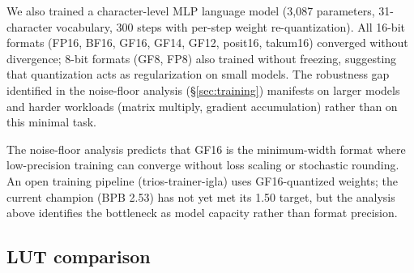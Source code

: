 \documentclass[11pt]{article}
\begin{document}
We also trained a character-level MLP language model (3{,}087 parameters,
31-character vocabulary, 300 steps with per-step weight re-quantization).
All 16-bit formats (FP16, BF16, GF16, GF14, GF12, posit16, takum16)
converged without divergence; 8-bit formats (GF8, FP8) also trained
without freezing, suggesting that quantization acts as regularization
on small models. The robustness gap identified in the noise-floor
analysis (\S\ref{sec:training}) manifests on larger models and harder
workloads (matrix multiply, gradient accumulation) rather than on
this minimal task.

The noise-floor analysis predicts that GF16 is the minimum-width format where
low-precision training can converge without loss scaling or stochastic rounding.
An open training pipeline (trios-trainer-igla) uses GF16-quantized weights; the
current champion (BPB 2.53) has not yet met its 1.50 target, but the analysis
above identifies the bottleneck as model capacity rather than format precision.

\subsection{LUT comparison}
\end{document}
